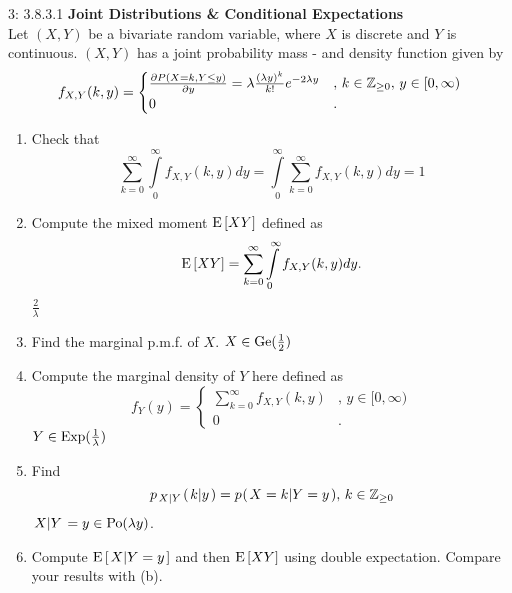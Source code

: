 \documentclass[a4paper,twoside=false,abstract=false,numbers=noenddot,
titlepage=false,headings=small,parskip=half,version=last]{scrartcl}
\begin{document}
\begin{exercise}{3: 3.8.3.1}
    \textbf{Joint Distributions \& Conditional Expectations} \\
    Let $(X, Y)$ be a bivariate random variable, where $X$ is discrete and $Y$
    is continuous. $(X, Y)$ has a joint probability mass - and density function
    given by
    \begin{equation}
        f_{X,Y}(k, y) = \begin{cases}
            \frac{\partial{P(X=k, Y\le y)}}{\partial{y}} =
            \lambda\frac{(\lambda y)^k}{k!}e^{-2\lambda y}
                    &,\, k\in\mathbb{Z}_{\ge 0},\, y\in [0, \infty) \\
            0       &.
        \end{cases}
    \end{equation}
    \begin{enumerate}
        \item Check that
            \begin{equation}
                \sum\limits_{k=0}^\infty \int\limits_0^\infty f_{X,Y}(k,y)dy =
                \int\limits_0^\infty \sum\limits_{k=0}^\infty f_{X,Y}(k,y)dy = 1
            \end{equation}

        \item \label{itm:b} Compute the mixed moment ${\rm E}\,[XY]$ defined as
            \begin{equation}
                {\rm E}\,[XY] =
                \sum\limits_{k=0}^\infty \int\limits_0^\infty f_{X,Y}(k,y)dy.
            \end{equation}
            \Answer $\frac{2}{\lambda}$

        \item Find the marginal p.m.f. of $X$.
            \Answer $X\in\text{Ge}(\frac{1}{2})$

        \item Compute the marginal density of $Y$ here defined as
            \begin{equation}
                f_Y(y) = \begin{cases}
                    \sum\limits_{k=0}^\infty f_{X,Y}(k,y) &, \, y\in[0,\infty) \\
                     0                                    &.
                \end{cases}
            \end{equation}
            \Answer $Y\in\text{Exp}(\frac{1}{\lambda})$

        \item Find
            \begin{equation}
                p_{\left. X \middle\vert Y \right.} (\left. k \middle\vert y \right.) =
                p_{} (\left. X=k \middle\vert Y=y \right.), \, k\in\mathbb{Z}_{\ge 0}
            \end{equation}
            \Answer $\left. X \middle\vert Y \right. = y\in\text{Po}(\lambda y)$.

        \item Compute ${\rm E}\,[\left. X \middle\vert Y=y \right.]$ and then
            ${\rm E}\,[XY]$ using double expectation.
            Compare your results with (b).

    \end{enumerate}
\end{exercise}
\end{document}
